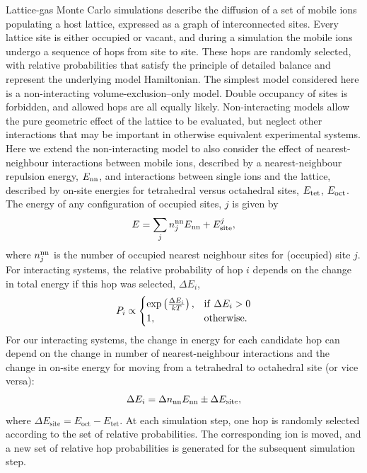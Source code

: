 \documentclass[aps,prb,twocolumn,superscriptaddress,reprint]{revtex4-1}
\begin{document}
Lattice-gas Monte Carlo simulations describe the diffusion of a set of mobile ions populating a host lattice, expressed as a graph of interconnected sites.\cite{Trudeau_GraphTheoryBook} 
Every lattice site is either occupied or vacant, and during a simulation the mobile ions undergo a sequence of hops from site to site. 
These hops are randomly selected, with relative probabilities that satisfy the principle of detailed balance and represent the underlying model Hamiltonian. 
The simplest model considered here is a non-interacting volume-exclusion--only model.\cite{Kutner_PhysLett1981} Double occupancy of sites is forbidden, and allowed hops are all equally likely. 
Non-interacting models allow the pure geometric effect of the lattice to be evaluated, but neglect other interactions that may be important in otherwise equivalent experimental systems. 
Here we extend the non-interacting model to also consider the effect of nearest-neighbour interactions between mobile ions, described by a nearest-neighbour repulsion energy, $E_{\mathrm{nn}}$, and interactions between single ions and the lattice, described by on-site energies for tetrahedral versus octahedral sites, $E_{\mathrm{tet}}$, $E_{\mathrm{oct}}$. 
The energy of any configuration of occupied sites, $j$ is given by
\begin{equation}
  E = \sum_j n_j^{\mathrm{nn}}E_{\mathrm{nn}} + E_{\mathrm{site}}^j,
\end{equation}
where $n^{\mathrm{nn}}_j$ is the number of occupied nearest neighbour sites for (occupied) site $j$. 
For interacting systems, the relative probability of hop $i$ depends on the change in total energy if this hop was selected, $\Delta E_i$,
\begin{equation}
  P_i \propto 
  \begin{cases}
    \mathrm{exp}\left(\frac{\Delta E_i}{kT}\right),& \mathrm{if}\,\,\Delta E_i > 0 \\
    1,                                        & \mathrm{otherwise.}
  \end{cases}
\end{equation}
For our interacting systems, the change in energy for each candidate hop can depend on the change in number of nearest-neighbour interactions and the change in on-site energy for moving from a tetrahedral to octahedral site (or vice versa):
\begin{equation}
  \Delta E_i = \Delta n_{\mathrm{nn}}E_{\mathrm{nn}} \pm \Delta E_{\mathrm{site}},
\end{equation}
where $\Delta E_\mathrm{site}=E_\mathrm{oct}-E_\mathrm{tet}$.
At each simulation step, one hop is randomly selected according to the set of relative probabilities. 
The corresponding ion is moved, and a new set of relative hop probabilities is generated for the subsequent simulation step.
\end{document}
